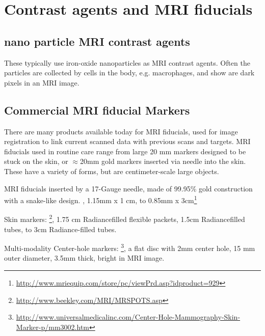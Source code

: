 \documentclass[letterpaper, 10 pt, conference]{ieeeconf}
\begin{document}
 
 \section{Contrast agents and MRI fiducials}

\subsection{nano particle MRI contrast agents}
These typically use iron-oxide nanoparticles as MRI contrast agents.  Often the particles are collected by cells in the body, e.g. macrophages, and show are dark pixels in an MRI image.




\subsection{Commercial MRI fiducial Markers}

There are many products available today for MRI fiducials, used for image registration to link current scanned data with previous scans and targets. 
MRI fiducials used in routine care range from large 20 mm markers designed to be stuck on the skin, or $\approx$20mm gold markers inserted via needle into the skin.
These have a variety of forms, but are centimeter-scale large objects.


MRI fiducials inserted by a 17-Gauge needle, made of 99.95\% gold construction with a snake-like design.  , 1.15mm x 1 cm, to 0.85mm x 3cm\footnote{\url{http://www.mriequip.com/store/pc/viewPrd.asp?idproduct=929}}

Skin markers: \footnote{\url{http://www.beekley.com/MRI/MRSPOTS.asp}}, 1.75 cm Radiance{\texttrademark}filled flexible packets,  1.5cm Radiance{\texttrademark}filled tubes, to 3cm Radiance{\texttrademark}-filled tubes.

Multi-modality Center-hole markers: \footnote{\url{http://www.universalmedicalinc.com/Center-Hole-Mammography-Skin-Marker-p/mm3002.htm}}, a flat disc with 2mm center hole, 15 mm outer diameter, 3.5mm thick, bright in MRI image.
 
 


\end{document}
